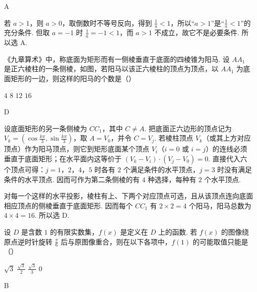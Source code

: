 \begin{answer}
A
\end{answer}

\begin{solution}
若 \(a>1\)，则 \(a>0\)，取倒数时不等号反向，得到 \(\frac1a<1\)，所以“\(a>1\)”是“\(\frac1a<1\)”的充分条件. 但取 \(a=-1\) 时 \(\frac1a=-1<1\)，而 \(a>1\) 不成立，故它不是必要条件. 所以选 A.
\end{solution}

\begin{problem}
《九章算术》中，称底面为矩形而有一侧棱垂直于底面的四棱锥为阳马. 设 \(AA_1\) 是正六棱柱的一条侧棱，如图，若阳马以该正六棱柱的顶点为顶点，以 \(AA_1\) 为底面矩形的一边，则这样的阳马的个数是（\quad）


\choices
    {\(4\)}
    {\(8\)}
    {\(12\)}
    {\(16\)}
\end{problem}

\begin{answer}
D
\end{answer}

\begin{solution}
设底面矩形的另一条侧棱为 \(CC_1\)，其中 \(C\ne A\). 把底面正六边形的顶点记为 \(V_k=(\cos\frac{k\pi}{3},\sin\frac{k\pi}{3})\)，取 \(A=V_0\)，并令 \(C=V_j\). 若棱柱顶点 \(V_k\)（或其上方对应顶点）作为阳马顶点，则它到矩形底面某个顶点 \(V_i\)（\(i=0\) 或 \(i=j\)）的连线必须垂直于底面矩形；在水平面内这等价于 \((V_k-V_i)\cdot(V_j-V_0)=0\). 直接代入六个顶点可得：\(j=1\)，\(2\)，\(4\)，\(5\) 时各有 \(2\) 个满足条件的水平顶点，\(j=3\) 时没有满足条件的水平顶点. 因而可作为第二条侧棱的有 \(4\) 种选择，每种有 \(2\) 个水平顶点.

对每一个这样的水平投影，棱柱有上、下两个对应顶点可选，且从该顶点连向底面相应顶点的侧棱垂直于底面矩形. 因而每个 \(CC_1\) 有 \(2\times2=4\) 个阳马，阳马总数为 \(4\times4=16\). 所以选 D.
\end{solution}

\begin{problem}
设 \(D\) 是含数 \(1\) 的有限实数集，\(f(x)\) 是定义在 \(D\) 上的函数. 若 \(f(x)\) 的图像绕原点逆时针旋转 \(\frac\pi6\) 后与原图像重合，则在以下各项中，\(f(1)\) 的可能取值只能是（\quad）

\choices
    {\(\sqrt3\)}
    {\(\frac{\sqrt3}{2}\)}
    {\(\frac{\sqrt3}{3}\)}
    {\(0\)}
\end{problem}

\begin{answer}
B
\end{answer}

